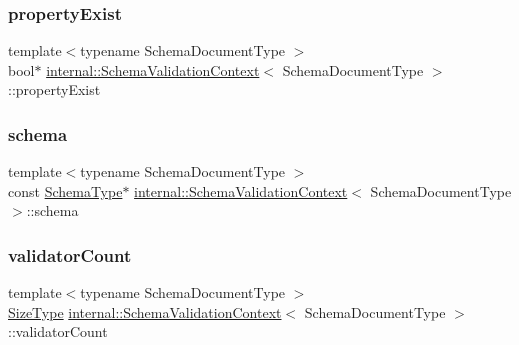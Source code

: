 \subsubsection{\texorpdfstring{property\+Exist}{propertyExist}}
{\footnotesize\ttfamily template$<$typename Schema\+Document\+Type $>$ \\
bool$\ast$ \hyperlink{structinternal_1_1SchemaValidationContext}{internal\+::\+Schema\+Validation\+Context}$<$ Schema\+Document\+Type $>$\+::property\+Exist}

\mbox{\label{structinternal_1_1SchemaValidationContext_af44336e8a612b77a0091cc57f8de1734}} 
\subsubsection{\texorpdfstring{schema}{schema}}
{\footnotesize\ttfamily template$<$typename Schema\+Document\+Type $>$ \\
const \hyperlink{structinternal_1_1SchemaValidationContext_a79b155ab3711b97b6e33ced450614397}{Schema\+Type}$\ast$ \hyperlink{structinternal_1_1SchemaValidationContext}{internal\+::\+Schema\+Validation\+Context}$<$ Schema\+Document\+Type $>$\+::schema}

\mbox{\label{structinternal_1_1SchemaValidationContext_a10e5e97640846f3c23eaaba0506bb4f7}} 
\subsubsection{\texorpdfstring{validator\+Count}{validatorCount}}
{\footnotesize\ttfamily template$<$typename Schema\+Document\+Type $>$ \\
\hyperlink{rapidjson_8h_a5ed6e6e67250fadbd041127e6386dcb5}{Size\+Type} \hyperlink{structinternal_1_1SchemaValidationContext}{internal\+::\+Schema\+Validation\+Context}$<$ Schema\+Document\+Type $>$\+::validator\+Count}

\mbox{\label{structinternal_1_1SchemaValidationContext_a1d215b80511f602ebece5c83b875cdd9}} 
